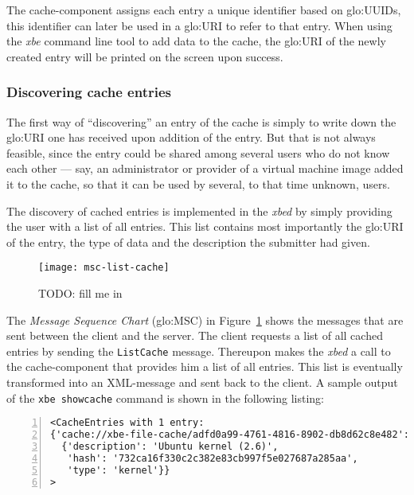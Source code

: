 The  cache-component  assigns each  entry  a  unique  identifier based  on
\gls{glo:UUID}s, this identifier  can later be used in  a \gls{glo:URI} to
refer to that  entry.  When using the \emph{xbe} command  line tool to add
data to  the cache, the \gls{glo:URI}  of the newly created  entry will be
printed on the screen upon success.

\subsubsection{Discovering cache entries}

The first way of ``discovering'' an  entry of the cache is simply to write
down the  \gls{glo:URI} one has received  upon addition of  the entry. But
that is not always feasible, since the entry could be shared among several
users who do not know each  other --- say, an administrator or provider of
a virtual machine image  added it to the cache, so that  it can be used by
several, to that time unknown, users.

The  discovery of  cached entries  is  implemented in  the \emph{xbed}  by
simply providing the  user with a list of all  entries. This list contains
most importantly the \gls{glo:URI} of the  entry, the type of data and the
description the submitter had given.

\begin{figure}[ht]
  \centering
  \texttt{[image: msc-list-cache]}
  \caption[MSC List Cache Entries]{TODO: fill me in}
  \label{fig:msc-list-cache}
\end{figure}

The      \emph{Message     Sequence     Chart}      (\gls{glo:MSC})     in
Figure~\ref{fig:msc-list-cache} shows  the messages that  are sent between
the  client and  the server.   The client  requests a  list of  all cached
entries  by sending  the \texttt{ListCache}  message. Thereupon  makes the
\emph{xbed} a call to the cache-component  that provides him a list of all
entries. This list is eventually  transformed into an XML-message and sent
back to the client.  A sample output of the \texttt{xbe showcache} command
is shown in the following listing:

\bigskip

\begin{center}
  \begin{minipage}{.75\textwidth}
    \begin{lstlisting}[captionpos=b,backgroundcolor=\color{listingcolor},frame=lines,numbers=left,numberstyle=\tiny,caption={\emph{xbe} output of cache entries.},label={lst:xbe-listcache-out}]
<CacheEntries with 1 entry:
{'cache://xbe-file-cache/adfd0a99-4761-4816-8902-db8d62c8e482':
  {'description': 'Ubuntu kernel (2.6)',
   'hash': '732ca16f330c2c382e83cb997f5e027687a285aa',
   'type': 'kernel'}}
>
    \end{lstlisting}
  \end{minipage}
\end{center}

